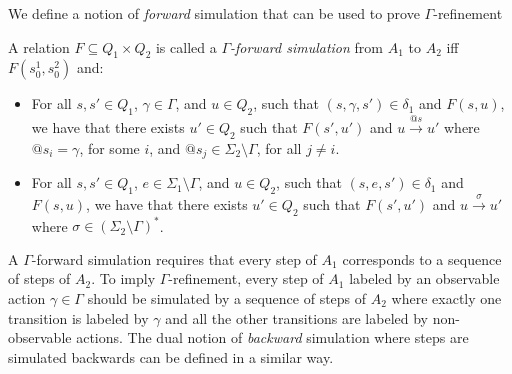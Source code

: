 We define a notion of \emph{forward} simulation that can be used to prove $\Gamma$-refinement %

\vspace{-1.5mm}
\begin{definition}
A relation $F \subseteq Q_{1} \times Q_{2}$ is called a \emph{$\Gamma$-forward simulation} from $A_1$ to $A_2$ if{f} $F(s_0^1,s_0^2)$ and:
\vspace{-1.5mm}
\begin{itemize}
\item For all $s,s'\in Q_1$, $\gamma\in \Gamma$, and $u\in Q_2$, such that $(s,\gamma,s') \in \delta_1$ and $F(s,u)$, we have that there exists $u'\in Q_2$ such that $F(s',u')$ and $u \xrightarrow{@s} u'$ where $@s_i=\gamma$, for some $i$, and $@s_j\in \Sigma_2\setminus\Gamma$, for all $j\neq i$.
\item For all $s,s'\in Q_1$, $e \in \Sigma_1\setminus \Gamma$, and $u\in Q_2$, such that $(s,e,s') \in \delta_1$ and $F(s,u)$, we have that there exists $u'\in Q_2$ such that $F(s',u')$ and $u \xrightarrow{\sigma} u'$ where $\sigma\in (\Sigma_2\setminus\Gamma)^*$.  
\end{itemize}
\vspace{-3.5mm}
\end{definition}
A $\Gamma$-forward simulation requires that every step of $A_1$ corresponds to a sequence of steps of $A_2$. To imply $\Gamma$-refinement, every step of $A_1$ labeled by an observable action $\gamma\in \Gamma$ should be simulated by a sequence of steps of $A_2$ where exactly one transition is labeled by $\gamma$ and all the other transitions are labeled by non-observable actions.
The dual notion of \emph{backward} simulation where steps are simulated backwards can be defined in a similar way.




